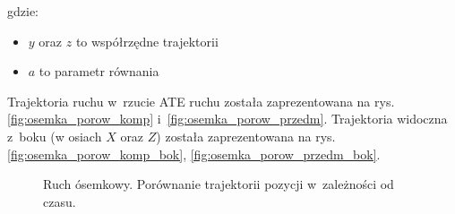 gdzie:
\begin{itemize}
	\item $y$ oraz $z$ to współrzędne trajektorii
	\item $a$ to parametr równania
\end{itemize}

Trajektoria ruchu w~rzucie ATE ruchu została zaprezentowana na rys. \ref{fig:osemka_porow_komp} i~\ref{fig:osemka_porow_przedm}. Trajektoria widoczna z~boku (w osiach $X$ oraz $Z$) została zaprezentowana na rys. \ref{fig:osemka_porow_komp_bok}, \ref{fig:osemka_porow_przedm_bok}.
\begin{figure}[H]
	\centering
	\hfill
	
	

	\caption{Ruch ósemkowy. Porównanie trajektorii pozycji w~zależności od czasu.}
	\label{fig:osemka_a}

\end{figure}

